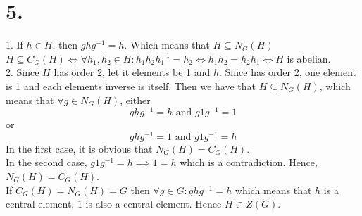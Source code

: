 \documentclass[11pt]{article}
\begin{document}
\section*{5.}
1.
If $h \in H$, then $ghg^{-1} = h$. Which means that $H \subseteq N_G(H)$  \\ 
$H \subseteq C_G(H) \iff \forall h_1,h_2 \in H: h_1 h_2 h_1^{-1} = h_2 \iff h_1 h_2 = h_2 h_1 \iff H$ is abelian. \\
2.
Since $H$ has order 2, let it elements be 1 and $h$.
Since has order 2, one element is 1 and each elements inverse is itself. Then we have that $H \subseteq N_G(H)$, which means that $\forall g \in N_G(H)$, either
\[ghg^{-1} = h \text{ and } g1g^{-1} = 1\]
or 
\[ghg^{-1} = 1 \text{ and } g1g^{-1} = h\]
In the first case, it is obvious that $N_G(H) = C_G(H)$. \\
In the second case, $g1g^{-1} = h \implies 1 = h$ which is a contradiction. Hence, $N_G(H) = C_G(H)$. \\
If $C_G(H) = N_G(H) = G$ then $\forall g \in G: ghg^{-1} = h$ which means that $h$ is a central element, $1$ is also a central element. Hence $H \subset Z(G)$.
\pagebreak
\end{document}

